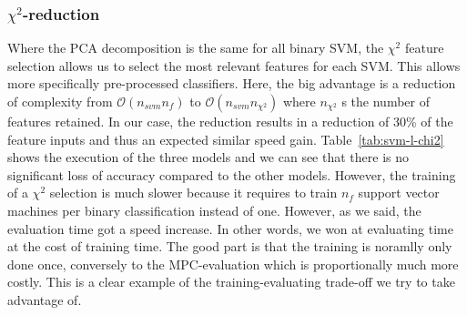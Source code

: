 \subsubsection{$\chi^2$-reduction}
Where the PCA decomposition is the same for all binary SVM, the $\chi^2$ feature selection allows us to select the most relevant features for each SVM. This allows more specifically pre-processed classifiers. Here, the big advantage is a reduction of complexity from $\mathcal{O}(n_{svm}n_f)$ to $\mathcal{O}(n_{svm}n_{\chi^2})$ where $n_{\chi^2}$ s the number of features retained. In our case, the reduction results in a reduction of 30\% of the feature inputs and thus an expected similar speed gain. Table~\ref{tab:svm-l-chi2} shows the execution of the three models and we can see that there is no significant loss of accuracy compared to the other models. However, the training of a $\chi^2$ selection is much slower because it requires to train $n_f$ support vector machines per binary classification instead of one. However, as we said, the evaluation time got a speed increase. In other words, we won at evaluating time at the cost of training time. The good part is that the training is noramlly only done once, conversely to the MPC-evaluation which is proportionally much more costly. This is a clear example of the training-evaluating trade-off we try to take advantage of.

